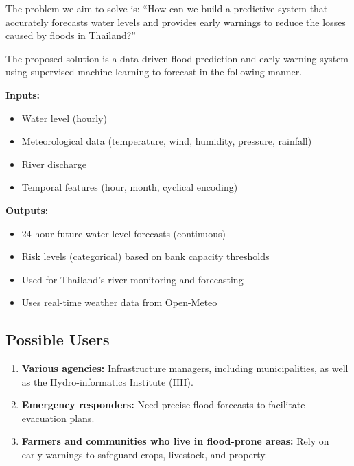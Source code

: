 The problem we aim to solve is: ``How can we build a predictive system that accurately forecasts water levels and provides early warnings to reduce the losses caused by floods in Thailand?''

The proposed solution is a data-driven flood prediction and early warning system using supervised machine learning to forecast in the following manner.

\vspace{0.5em}
\noindent \textbf{Inputs:}
\begin{itemize}
    \item Water level (hourly)
    \item Meteorological data (temperature, wind, humidity, pressure, rainfall)
    \item River discharge
    \item Temporal features (hour, month, cyclical encoding)
\end{itemize}

\noindent \textbf{Outputs:}
\begin{itemize}
    \item 24-hour future water-level forecasts (continuous)
    \item Risk levels (categorical) based on bank capacity thresholds
    \item Used for Thailand’s river monitoring and forecasting
    \item Uses real-time weather data from Open-Meteo
\end{itemize}

\subsection{Possible Users}
\begin{enumerate}
    \item \textbf{Various agencies:} Infrastructure managers, including municipalities, as well as the Hydro-informatics Institute (HII).
    \item \textbf{Emergency responders:} Need precise flood forecasts to facilitate evacuation plans.
    \item \textbf{Farmers and communities who live in flood-prone areas:} Rely on early warnings to safeguard crops, livestock, and property.
\end{enumerate}